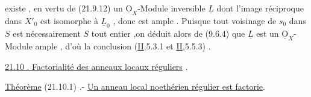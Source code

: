 existe , en vertu de (21.9.12) un $\underline{\mathrm O}_X$-Module inversible $\underline L$ dont 
l'image réciproque dans $X'_0$ est isomorphe à $\underline L_0$ , donc est ample . Puisque tout voisinage de $s_0$ dans $S$ est nécessairement $S$ tout entier ,on déduit alors de (9.6.4) que $\underline L$ est un $\underline{\mathrm O}_X$-Module ample , d'où la conclusion  (\uline{II},5.3.1 et \uline{II},5.5.3) .

\uline{21.10 . Factorialité des anneaux locaux réguliers} .

\uline{Théorème} (21.10.1)  .- \uline{Un anneau local noethérien régulier est factorie}.

